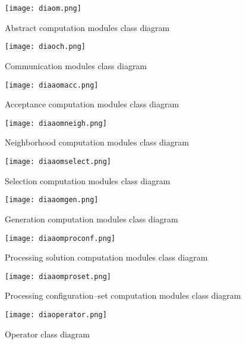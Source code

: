 \begin{figure}
	\centering
	\texttt{[image: diaom.png]}
	\caption[]{Abstract computation modules class diagram}\label{diag:om}
\end{figure}

\begin{figure}
	\centering
	\texttt{[image: diaoch.png]}
	\caption[]{Communication modules class diagram}\label{diag:opch}
\end{figure}

\begin{figure}
	\centering
	\texttt{[image: diaaomacc.png]}
	\caption[]{Acceptance computation modules class diagram}\label{diag:accmodules}
\end{figure}

\begin{figure}
	\centering
	\texttt{[image: diaaomneigh.png]}
	\caption[]{Neighborhood computation modules class diagram}\label{diag:neighmodules}
\end{figure}

\begin{figure}
	\centering
	\texttt{[image: diaaomselect.png]}
	\caption[]{Selection computation modules class diagram}\label{diag:selectmodules}
\end{figure}

\begin{figure}
	\centering
	\texttt{[image: diaaomgen.png]}
	\caption[]{Generation computation modules class diagram}\label{diag:genmodules}
\end{figure}

\begin{figure}
	\centering
	\texttt{[image: diaaomproconf.png]}
	\caption[]{Processing solution computation modules class diagram}\label{diag:procconfmodules}
\end{figure}

\begin{figure}
	\centering
	\texttt{[image: diaaomproset.png]}
	\caption[]{Processing configuration--set computation modules class diagram}\label{diag:procsetmodules}
\end{figure}

\begin{figure}
	\centering
	\texttt{[image: diaoperator.png]}
	\caption[]{Operator class diagram}\label{diag:operator}
\end{figure}

